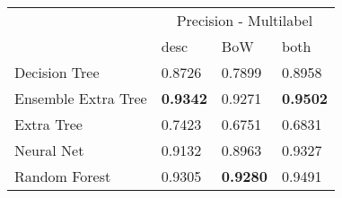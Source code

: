 \begin{tabular}{|l|l|l|l| }
\hline
 &  \multicolumn{3}{c|}{Precision - Multilabel} \\
\cline{2-4} & desc & BoW & both \\ \hline
Decision Tree       & 0.8726 & 0.7899 & 0.8958\\
Ensemble Extra Tree & {\bf 0.9342} & 0.9271 & {\bf 0.9502}\\
Extra Tree          & 0.7423 & 0.6751 & 0.6831\\
Neural Net          & 0.9132 & 0.8963 & 0.9327\\
Random Forest       & 0.9305 & {\bf 0.9280} & 0.9491\\
\hline
\end{tabular}